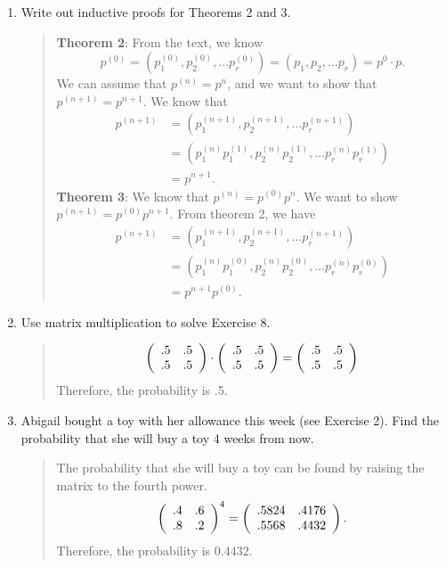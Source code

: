 \documentclass{hw}
\begin{document}
\begin{enumerate}
\item Write out inductive proofs for Theorems 2 and 3.
\begin{quote}
\textbf{Theorem 2}: From the text, we know
\[
p^{(0)}=(p_{1}^{(0)},p_{2}^{(0)},\dots p_{r}^{(0)})=
(p_{1},p_{2},\dots p_{r})=p^{0}\cdot p.
\]
We can assume that $p^{(n)}=p^{n}$, and we want to show that $p^{(n+1)}=p^{n+1}$. We know that
\begin{align*}
p^{(n+1)}&=(p_{1}^{(n+1)},p_{2}^{(n+1)},\dots p_{r}^{(n+1)})\\
&= (p_{1}^{(n)}p_{1}^{(1)},p_{2}^{(n)}p_{2}^{(1)},\dots p_{r}^{(n)}p_{r}^{(1)})\\
&= p^{n+1}.
\end{align*}
\textbf{Theorem 3}: We know that $p^{(n)}=p^{(0)}p^{n}$. We want to show $p^{(n+1)}=p^{(0)}p^{n+1}$.
From theorem 2, we have
\begin{align*}
p^{(n+1)}&=(p_{1}^{(n+1)},p_{2}^{(n+1)},\dots p_{r}^{(n+1)})\\
&= (p_{1}^{(n)}p_{1}^{(0)},p_{2}^{(n)}p_{2}^{(0)},\dots p_{r}^{(n)}p_{r}^{(0)})\\
&= p^{n+1}p^{(0)}.
\end{align*}
\end{quote}

\item Use matrix multiplication to solve Exercise 8.
\begin{quote}
\[
\left(
\begin{array}{c c}
.5 & .5\\
.5 & .5
\end{array}
\right)
\cdot
\left(
\begin{array}{c c}
.5 & .5\\
.5 & .5
\end{array}
\right)
=
\left(
\begin{array}{c c}
.5 & .5\\
.5 & .5
\end{array}
\right)
\]
Therefore, the probability is .5.
\end{quote}

\item Abigail bought a toy with her allowance this week (see Exercise 2). Find the probability that
she will buy a toy 4 weeks from now.
\begin{quote}
The probability that she will buy a toy can be found by raising the matrix to the fourth power.
\[
\left(
\begin{array}{c c}
.4 & .6\\
.8 & .2
\end{array}
\right)^{4}
=
\left(
\begin{array}{c c}
.5824 & .4176\\
.5568 & .4432
\end{array}
\right).
\]
Therefore, the probability is $0.4432$.
\end{quote}


\end{enumerate}
\end{document}
